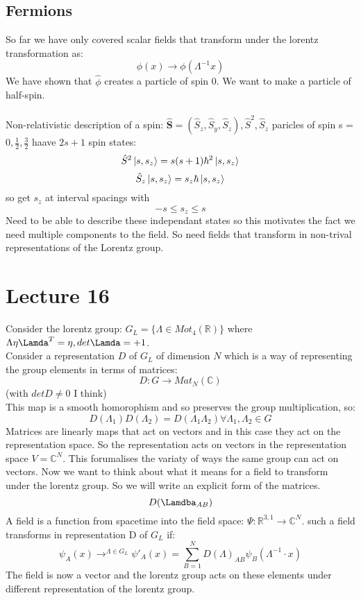 \documentclass[12pt, a4paper, twoside, titlepage]{article}
\begin{document}
\subsection{Fermions}
So far we have only covered scalar fields that transform under the lorentz transformation as:
$$
\phi(x) \rightarrow \phi(\Lambda^{-1}x)
$$
We have shown that $\hat \phi$ creates a particle of spin 0. We want to make a particle of half-spin.\\\\
Non-relativistic description of a spin: $\hat{\bm S} = (\hat S_z, \hat S_y, \hat S_z), \hat{S}^2, \hat{S}_z$ paricles of spin s = $0, \frac{1}{2}, \frac{3}{2}$ haave $2 s +1$ spin states:
$$
\hat{S}^2 \ket{s, s_z} = s(s+1)\hbar^2 \ket{s,s_z}
$$
$$
\hat S_z \ket{s,s_z} = s_z \hbar \ket{s,s_z}
$$
so get $s_z$ at interval spacings with
$$
-s \leq s_z \leq s
$$
Need to be able to describe these independant states so this motivates the fact we need multiple components to the field. So need fields that transform in non-trival representations of the Lorentz group.
\section{Lecture 16}
Consider the lorentz group: $G_L = \{ \Lambda \in Mot_4(\mathbb{R})\}$ where $\Lambda \eta \Lamda^T = \eta, det \Lamda = +1$.\\
Consider a representation $D$ of $G_L$ of dimension $N$ which is a way of representing the group elements in terms of matrices:
$$
D: G \rightarrow Mat_N(\mathbb{C})
$$
(with $det D \neq 0$ I think)\\
This map is a smooth homorophism and so preserves the group multiplication, so:
$$
D(\Lambda_1)D(\Lambda_2) = D(\Lambda_1 \Lambda_2) \forall \Lambda_1, \Lambda_2 \in G 
$$
Matrices are linearly maps that act on vectors and in this case they act on the representation space. So the representation acts on vectors in the representation space $V = \mathbb{C}^N$. This forumalises the variaty of ways the same group can act on vectors. Now we want to think about what it means for a field to transform under the lorentz group. So we will write an explicit form of the matrices.
$$
D(\Lamdba_{AB})
$$
A field is a function from spacetime into the field space: $\Psi: \mathbb{R}^{3,1} \rightarrow \mathbb{C}^N$. such a field transforms in representation D of $G_L$ if:
$$
\psi_A(x) \rightarrow^{\Lambda \in G_L} \psi'_A(x) = \sum_{B=1}^N D(\Lambda)_{AB}\psi_B(\Lambda^{-1} \cdot x)
$$
The field is now a vector and the lorentz group acts on these elements under different representation of the lorentz group.
\end{document}
